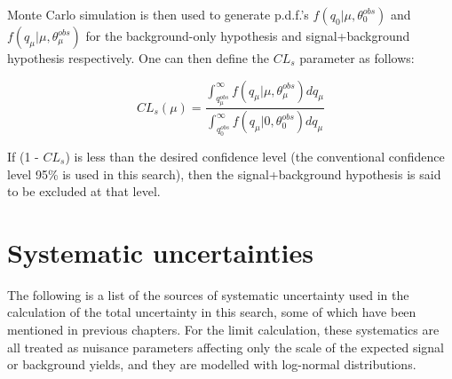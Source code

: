 Monte Carlo simulation is then used to generate p.d.f.'s $f(q_{0}\vert\mu,\theta^{obs}_{0})$ and $f(q_{\mu}\vert\mu,\theta^{obs}_{\mu})$ for the background-only hypothesis and signal+background hypothesis respectively. One can then define the $CL_{s}$ parameter as follows:

\begin{equation}
CL_{s}(\mu) = \frac{\int_{q^{obs}_{\mu}}^{\infty} f(q_{\mu}\vert\mu,\theta^{obs}_{\mu}) dq_{\mu}}{\int_{q^{obs}_{0}}^{\infty} f(q_{\mu}\vert0,\theta^{obs}_{0}) dq_{\mu}}
\label{eq:CLS-def}
\end{equation}

If (1 - $CL_{s}$) is less than the desired confidence level (the conventional confidence level 95\% is used in this search), then the signal+background hypothesis is said to be excluded at that level.

\section{Systematic uncertainties\label{sec:results-systematics}}

The following is a list of the sources of systematic uncertainty used in the calculation of the total uncertainty in this search, some of which have been mentioned in previous chapters. For the limit calculation, these systematics are all treated as nuisance parameters affecting only the scale of the expected signal or background yields, and they are modelled with log-normal distributions.

